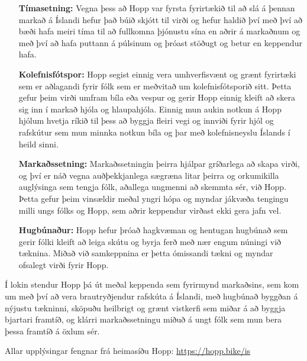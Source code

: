 \documentclass{article}
\begin{document}
	\begin{itemize}
		\item[\textbf{Tímasetning:}] Vegna þess að Hopp var fyrsta fyrirtækið til að slá á þennan 
			markað á Íslandi hefur það búið skjótt til virði og hefur 
			haldið því með því að bæði hafa meiri tíma til að fullkomna 
			þjónustu sína en aðrir á markaðnum og með því að hafa 
			puttann á púlsinum og þróast stöðugt og betur en keppendur 
			hafa.
		\item[\textbf{Kolefnisfótspor:}] Hopp segist einnig vera umhverfisvænt og grænt fyrirtæki 
			sem er aðlagandi fyrir fólk sem er meðvitað um kolefnisfótsporið
			sitt. Þetta gefur þeim virði umfram bíla eða vespur og gerir 
			Hopp einnig kleift að skera sig inn í markað hjóla og 
			hlaupahjóla. Einnig mun aukin notkun á Hopp hjólum hvetja ríkið 
			til þess að byggja fleiri vegi og innviði fyrir hjól og rafskútur sem mun 
			minnka notkun bíla og þar með kolefnisneyslu Íslands í heild 
			sinni.
		\item[\textbf{Markaðssetning:}] Markaðssetningin þeirra hjálpar gríðarlega að skapa virði,
			 og því er náð vegna auðþekkjanlega sægræna litar þeirra og
			orkumikilla auglýsinga sem tengja fólk, aðallega ungmenni 
			að skemmta sér, við Hopp. Þetta gefur þeim vinsældir meðal 
			yngri hópa og myndar jákvæða tengingu milli ungs fólks og Hopp,
			 sem aðrir keppendur virðast ekki gera jafn vel.
		\newpage
		\item[\textbf{Hugbúnaður:}] Hopp hefur þróað hagkvæman og hentugan hugbúnað sem gerir 
			fólki kleift að leiga skútu og byrja ferð með nær engum núningi 
			við tæknina. Miðað við samkeppnina er þetta ómissandi tækni og 
			myndar ofsalegt virði fyrir Hopp.
	\end{itemize}

	\vspace{3mm}

	Í lokin stendur Hopp þá út meðal keppenda sem fyrirmynd markaðsins, 
	sem kom um með því að vera brautryðjendur rafskúta á Íslandi, með 
	hugbúnað byggðan á nýjustu tækninni,
	sköpuðu heilbrigt og 
	grænt vistkerfi sem miðar á að byggja bjartari framtíð, og klárri markaðssetningu miðuð á ungt fólk sem mun bera þessa framtíð á öxlum sér. 

	\vspace{1cm}

	Allar upplýsingar fengnar frá heimasíðu Hopp: \url{https://hopp.bike/is}
\end{document}
